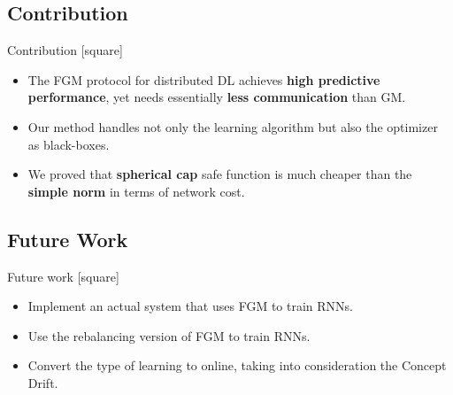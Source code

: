 \subsection{Contribution}\label{subsec:contribution}

\begin{frame}{Contribution}
    [square]
    \begin{itemize}
        \item{The FGM protocol for distributed DL achieves \textbf{high predictive performance}, yet needs
        essentially \textbf{less communication} than GM.}
        \vspace{1cm}
        \item{Our method handles not only the learning algorithm but also the optimizer as black-boxes.}
        \vspace{1cm}
        \item{We proved that \textbf{spherical cap} safe function is much cheaper than the \textbf{simple norm} in terms of network cost.}
    \end{itemize}
\end{frame}

\subsection{Future Work}\label{subsec:future-work}

\begin{frame}{Future work}
    [square]
    \begin{itemize}
        \item{Implement an actual system that uses FGM to train RNNs.}
        \vspace{1cm}
        \item{Use the rebalancing version of FGM to train RNNs.}
        \vspace{1cm}
        \item{Convert the type of learning to online, taking into consideration the Concept Drift.}
    \end{itemize}
\end{frame}